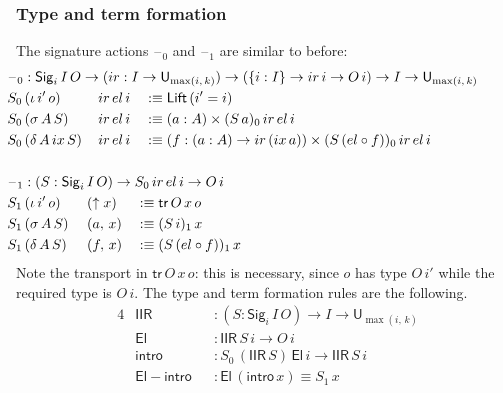 \documentclass[acmsmall,screen,review,anonymous]{acmart}
\newcommand{\msf}[1]{{\mathsf{#1}}}
\newcommand{\U}{\msf{U}}
\newcommand{\El}{\msf{El}}
\newcommand{\Lift}{\msf{Lift}}
\newcommand{\lup}{\uparrow}
\newcommand{\Sig}{\msf{Sig}}
\newcommand{\blank}{{\mathord{\hspace{1pt}\text{--}\hspace{1pt}}}}
\newcommand{\ir}{{ir}}
\newcommand{\el}{{el}}
\newcommand{\ix}{{ix}}
\newcommand{\intro}{\msf{intro}}
\newcommand{\tr}{\msf{tr}}
\newcommand{\IIR}{\msf{IIR}}
\begin{document}
\subsubsection{Type and term formation}\label{sec:iir-type-and-term-formation}
The signature actions $\blank_0$ and $\blank_1$ are similar to before:
\begin{alignat*}{4}
  &\hspace{-6em}\rlap{$\blank_0 : \Sig_i\,I\,O \to (\ir : I \to \U_{\max(i,\,k)}) \to (\{i : I\} \to \ir\,i \to O\,i) \to I \to \U_{\max(i,\,k)}$} \\
  &\hspace{-6em}S_0\,(\iota\,i'\,o)     \,&&\ir\,\el\,i && :\equiv \Lift\,(i' = i)\\
  &\hspace{-6em}S_0\,(\sigma\,A\,S)     \,&&\ir\,\el\,i && :\equiv (a : A) \times (S\,a)_0\,\ir\,\el\,i\\
  &\hspace{-6em}S_0\,(\delta\,A\,\ix\,S)\,&&\ir\,\el\,i && :
                     \equiv (f : (a : A) \to \ir\,(\ix\,a)) \times (S\,(\el \circ f))_0\,\ir\,\el\,i\\
  &\hspace{-6em} && &&\\
  &\hspace{-6em}\rlap{$\blank_1 : (S : \Sig_i\,I\,O) \to S_0\,\ir\,\el\,i \to O\,i$} \\
  &\hspace{-6em}S_1\,(\iota\,i'\,o)\,&&\hspace{-0.8em}(\lup x) && \hspace{-0.6em}:\equiv \tr\,O\,x\,o\\
  &\hspace{-6em}S_1\,(\sigma\,A\,S)\,&&\hspace{-0.8em}(a,\,x)  && \hspace{-0.6em}:\equiv (S\,i)_1\,x\\
  &\hspace{-6em}S_1\,(\delta\,A\,S)\,&&\hspace{-0.8em}(f,\,x)  && \hspace{-0.6em}:\equiv (S\,(\el \circ f))_1\,x
\end{alignat*}
Note the transport in $\tr\,O\,x\,o$: this is necessary, since $o$ has type $O\,i'$ while the
required type is $O\,i$. The type and term formation rules are the following.
\begin{alignat*}{4}
  &\IIR               && : (S : \Sig_i\,I\,O) \to I \to \U_{\max(i,\,k)}\\
  &\El                && : \IIR\,S\,i \to O\,i\\
  &\intro             && : S_0\,(\IIR\,S)\,\El\,i \to \IIR\,S\,i\\
  &\msf{El\!\!-\!\!intro} && : \El\,(\intro\,x) \equiv S_1\,x
\end{alignat*}
\end{document}
